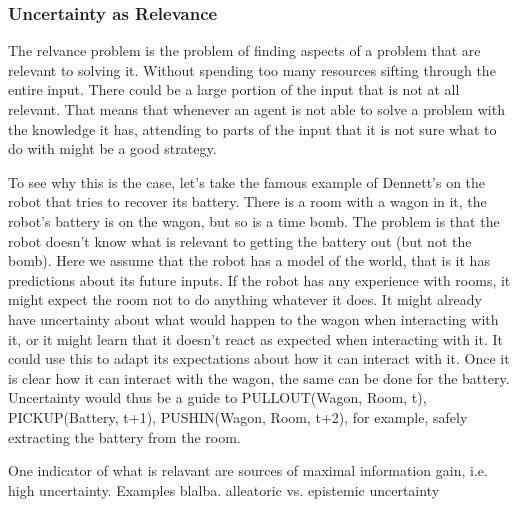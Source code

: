 \documentclass[10pt,a4paper,twocolumn]{article}
\begin{document}
\subsubsection{Uncertainty as Relevance}
The relvance problem is the problem of finding aspects of a problem that are relevant to solving it. Without spending too many resources sifting through the entire input. There could be a large portion of the input that is not at all relevant. That means that whenever an agent is not able to solve a problem with the knowledge it has, attending to parts of the input that it is not sure what to do with might be a good strategy.

To see why this is the case, let's take the famous example of Dennett's on the robot that tries to recover its battery. There is a room with a wagon in it, the robot's battery is on the wagon, but so is a time bomb. The problem is that the robot doesn't know what is relevant to getting the battery out (but not the bomb).
Here we assume that the robot has a model of the world, that is it has predictions about its future inputs. If the robot has any experience with rooms, it might expect the room not to do anything whatever it does. It might already have uncertainty about what would happen to the wagon when interacting with it, or it might learn that it doesn't react as expected when interacting with it. It could use this to adapt its expectations about how it can interact with it. Once it is clear how it can interact with the wagon, the same can be done for the battery. Uncertainty would thus be a guide to PULLOUT(Wagon, Room, t), PICKUP(Battery, t+1), PUSHIN(Wagon, Room, t+2), for example, safely extracting the battery from the room. 

One indicator of what is relavant are sources of maximal information gain, i.e. high uncertainty. Examples blalba.
alleatoric vs. epistemic uncertainty
\end{document}
